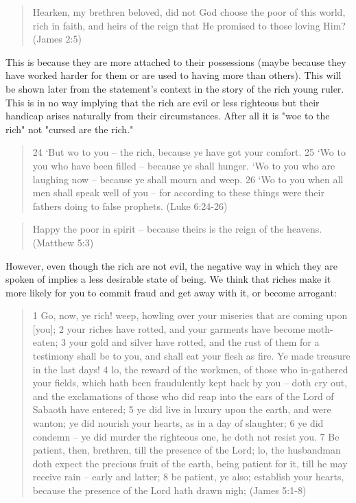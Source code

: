 \documentclass[11pt]{article}
\begin{document}
\begin{quote} 
Hearken, my brethren beloved, did not God choose the poor of this world, rich in faith, and heirs of the reign that He promised to those loving Him? (James 2:5)
\end{quote}
This is because they are more attached to their possessions (maybe because they have worked harder for them or are used to having more than others). This will be shown later from the statement's context in the story of the rich young ruler. This is in no way implying that the rich are evil or less righteous but their handicap arises naturally from their circumstances. After all it is "woe to the rich" not "cursed are the rich."
\begin{quote}
24 `But wo to you -- the rich, because ye have got your comfort. 25 `Wo to you who have been filled -- because ye shall hunger. `Wo to you who are laughing now -- because ye shall mourn and weep. 26 `Wo to you when all men shall speak well of you -- for according to these things were their fathers doing to false prophets. (Luke 6:24-26)
\end{quote}
\begin{quote}
Happy the poor in spirit -- because theirs is the reign of the heavens. (Matthew 5:3) 
\end{quote}
However, even though the rich are not evil, the negative way in which they are spoken of implies a less desirable state of being. We think that riches make it more likely for you to commit fraud and get away with it, or become arrogant:
\begin{quote}
1 Go, now, ye rich! weep, howling over your miseries that are coming upon [you]; 2 your riches have rotted, and your garments have become moth-eaten; 3 your gold and silver have rotted, and the rust of them for a testimony shall be to you, and shall eat your flesh as fire. Ye made treasure in the last days! 4 lo, the reward of the workmen, of those who in-gathered your fields, which hath been fraudulently kept back by you -- doth cry out, and the exclamations of those who did reap into the ears of the Lord of Sabaoth have entered; 5 ye did live in luxury upon the earth, and were wanton; ye did nourish your hearts, as in a day of slaughter; 6 ye did condemn -- ye did murder the righteous one, he doth not resist you. 7 Be patient, then, brethren, till the presence of the Lord; lo, the husbandman doth expect the precious fruit of the earth, being patient for it, till he may receive rain -- early and latter; 8 be patient, ye also; establish your hearts, because the presence of the Lord hath drawn nigh; (James 5:1-8)
\end{quote}
\end{document}

